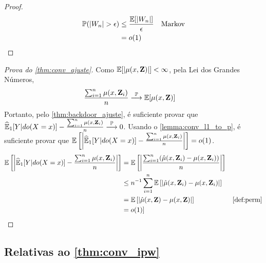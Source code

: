 \begin{proof}
 \begin{align*}
  {\mathbb P}(|W_n| > \epsilon)
  &\leq \frac{{\mathbb E}[|W_n|]}{\epsilon} & \text{Markov} \\
  &= o(1)
 \end{align*}
\end{proof}

\begin{proof}[Prova do \cref{thm:conv_ajuste}]
 Como ${\mathbb E}[|\mu(x,{\mathbf{Z}})|] < \infty$,
 pela Lei dos Grandes Números,
 \begin{align*}
  \frac{\sum_{i=1}^n \mu(x,{\mathbf{Z}}_i)}{n}
  &\stackrel{{\mathbb P}}{\longrightarrow} {\mathbb E}[\mu(x,{\mathbf{Z}})]
 \end{align*}
 Portanto, pelo \cref{thm:backdoor_ajuste},
 é suficiente provar que
 ${\widehat{{\mathbb E}}}_{1}[Y|do(X=x)] - \frac{\sum_{i=1}^n \mu(x,{\mathbf{Z}}_i)}{n} \stackrel{{\mathbb P}}{\longrightarrow} 0$.
 Usando o \cref{lemma:conv_l1_to_p}, é suficiente provar que 
 ${\mathbb E}\left[\bigg|{\widehat{{\mathbb E}}}_{1}[Y|do(X=x)] - \frac{\sum_{i=1}^n \mu(x,{\mathbf{Z}}_i)}{n}\bigg|\right] 
 = o(1)$.
 \begin{align*}
  \E\left[\bigg|\hdoy - \frac{\sum_{i=1}^n \mu(x,\Z_i)}{n}\bigg|\right]
  &= \E\left[\bigg|\frac{\sum_{i=1}^n 
  (\hat{\mu}(x,\Z_i)-\mu(x,\Z_i))}{n}\bigg|\right] \\
  &\leq n^{-1}\sum_{i=1}^n \E\left[| 
  \hat{\mu}(x,\Z_i)-\mu(x,\Z_i)|\right] \\
  &= \E\left[|\hat{\mu}(x,\Z)-\mu(x,\Z)|\right] 
  & \text{\cref{def:perm}} \\
  &= o(1)]
 \end{align*}
\end{proof}

\subsection{Relativas ao \cref{thm:conv_ipw}}

